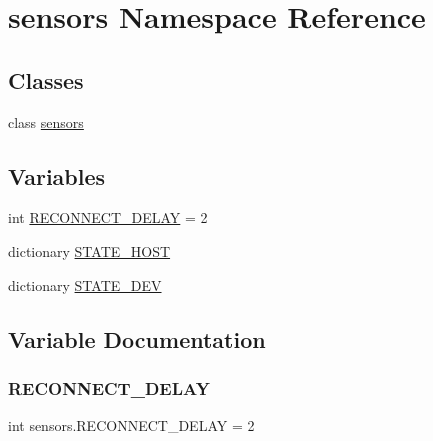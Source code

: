\hypertarget{namespacesensors}{}\section{sensors Namespace Reference}
\label{namespacesensors}
\subsection*{Classes}
\begin{DoxyCompactItemize}
\item 
class \hyperlink{classsensors_1_1sensors}{sensors}
\end{DoxyCompactItemize}
\subsection*{Variables}
\begin{DoxyCompactItemize}
\item 
int \hyperlink{namespacesensors_a99ab4dee7f9f47c7a639bb40f4b7e825}{R\+E\+C\+O\+N\+N\+E\+C\+T\+\_\+\+D\+E\+L\+AY} = 2
\item 
dictionary \hyperlink{namespacesensors_a8322f64bc3ad8586a690ed3784045818}{S\+T\+A\+T\+E\+\_\+\+H\+O\+ST}
\item 
dictionary \hyperlink{namespacesensors_a794af4139a7bfc25cc25f79a01140584}{S\+T\+A\+T\+E\+\_\+\+D\+EV}
\end{DoxyCompactItemize}


\subsection{Variable Documentation}
\mbox{\label{namespacesensors_a99ab4dee7f9f47c7a639bb40f4b7e825}} 
\subsubsection{\texorpdfstring{R\+E\+C\+O\+N\+N\+E\+C\+T\+\_\+\+D\+E\+L\+AY}{RECONNECT\_DELAY}}
{\footnotesize\ttfamily int sensors.\+R\+E\+C\+O\+N\+N\+E\+C\+T\+\_\+\+D\+E\+L\+AY = 2}

\mbox{\label{namespacesensors_a794af4139a7bfc25cc25f79a01140584}} 
